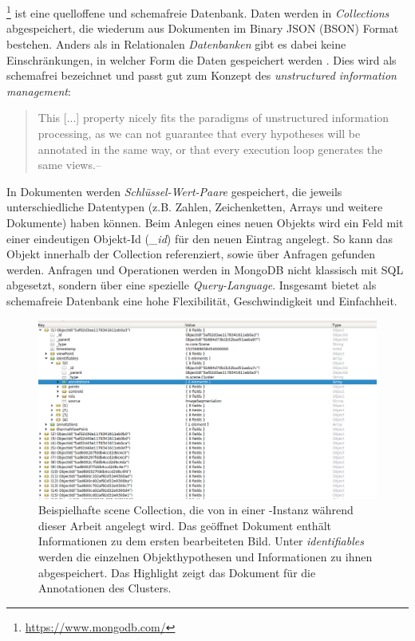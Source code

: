\section{\mongodb}
\label{sec:mongodb}
\mongodb\footnote{\url{https://www.mongodb.com/}} ist eine quelloffene und schemafreie Datenbank. Daten werden in \textit{Collections} abgespeichert, die wiederum aus Dokumenten im Binary JSON (BSON) Format bestehen. Anders als in Relationalen \textit{Datenbanken} gibt es dabei keine Einschränkungen, in welcher Form die Daten gespeichert werden \cite{mongoVsOracle}. Dies wird als schemafrei bezeichnet und passt gut zum Konzept des \textit{unstructured information management}:
\begin{quote}
\glqq This [...] property nicely fits the paradigms of unstructured information processing, as we can not guarantee that every hypotheses will be annotated in the same way, or that every execution loop generates the same views.\grqq \hfill -- \cite{episodicMemory}
\end{quote}
In Dokumenten werden \textit{Schlüssel-Wert-Paare} gespeichert, die jeweils unterschiedliche Datentypen (z.B. Zahlen, Zeichenketten, Arrays und weitere Dokumente) haben können. Beim Anlegen eines neuen Objekts wird ein Feld mit einer eindeutigen Objekt-Id (\textit{\_id}) für den neuen Eintrag angelegt. So kann das Objekt innerhalb der Collection referenziert, sowie über Anfragen gefunden werden. Anfragen und Operationen werden in MongoDB nicht klassisch mit SQL abgesetzt, sondern über eine spezielle \textit{Query-Language}. Insgesamt bietet \mongodb als schemafreie Datenbank eine hohe Flexibilität, Geschwindigkeit und Einfachheit. \cite{mongoVsOracle} \par

\begin{figure}
\centering
\includegraphics[width=\textwidth]{img/chapter3/mongoPic.png}
\caption[Die scene Collection einer \mongodb-Instanz]{Beispielhafte scene Collection, die von \robosherlock in einer \mongodb-Instanz während dieser Arbeit angelegt wird. Das geöffnet Dokument enthält Informationen zu dem ersten bearbeiteten Bild. Unter \textit{identifiables} werden die einzelnen Objekthypothesen und Informationen zu ihnen abgespeichert. Das Highlight zeigt das Dokument für die Annotationen des Clusters.}
\end{figure}

